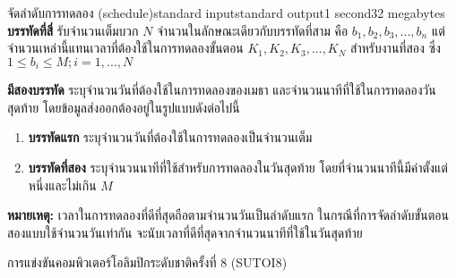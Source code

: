 \documentclass[11pt,a4paper]{article}
\begin{document}
\begin{problem}{จัดลำดับการทดลอง (schedule)}{standard input}{standard output}{1 second}{32 megabytes}
\textbf{บรรทัดที่สี่} รับจำนวนเต็มบวก $N$ จำนวนในลักษณะเดียวกับบรรทัดที่สาม  คือ $b_1,b_2,b_3,...,b_n$ แต่จำนวนเหล่านี้แทนเวลาที่ต้องใช้ในการทดลองขั้นตอน $K_1,K_2,K_3,...,K_N$ สำหรับงานที่สอง ซึ่ง $1 \leq b_i \leq M; i = 1,...,N$


\OutputFile

\textbf{มีสองบรรทัด} ระบุจำนวนวันที่ต้องใช้ในการทดลองของเมธา และจำนวนนาทีที่ใช้ในการทดลองวันสุดท้าย โดยข้อมูลส่งออกต้องอยู่ในรูปแบบดังต่อไปนี้

\begin{enumerate}

\item \textbf{บรรทัดแรก} ระบุจำนวนวันที่ต้องใช้ในการทดลองเป็นจำนวนเต็ม
\item \textbf{บรรทัดที่สอง} ระบุจำนวนนาทีที่ใช้สำหรับการทดลองในวันสุดท้าย โดยที่จำนวนนาทีนี้มีค่าตั้งแต่หนึ่งและไม่เกิน $M$
\end{enumerate}

\textbf{หมายเหตุ:}  เวลาในการทดลองที่ดีที่สุดถือตามจำนวนวันเป็นลำดับแรก ในกรณีที่การจัดลำดับขั้นตอนสองแบบใช้จำนวนวันเท่ากัน จะนับเวลาที่ดีที่สุดจากจำนวนนาทีที่ใช้ในวันสุดท้าย

\Examples

\begin{example}
%
%
%
\end{example}


\Source

การแข่งขันคอมพิวเตอร์โอลิมปิกระดับชาติครั้งที่ 8 (SUTOI8)

\end{problem}
\end{document}
